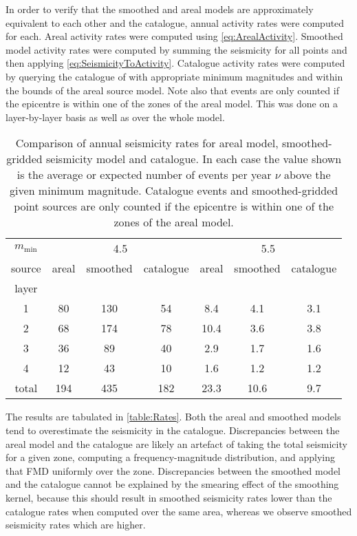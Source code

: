 \documentclass{article}
\begin{document}
In order to verify that the smoothed and areal models are approximately equivalent to each other and the catalogue, annual activity rates were computed for each.
Areal activity rates were computed using \eqref{eq:ArealActivity}.
Smoothed model activity rates were computed by summing the seismicity for all points and then applying \eqref{eq:SeismicityToActivity}.
Catalogue activity rates were computed by querying the catalogue of \cite{nath2010earthquake} with appropriate minimum magnitudes and within the bounds of the areal source model.
Note also that events are only counted if the epicentre is within one of the zones of the areal model.
This was done on a layer-by-layer basis as well as over the whole model.

\begin{table}
\caption[Comparison of annual seismicity rates]{Comparison of annual seismicity rates for areal model, smoothed-gridded seismicity model and catalogue.
In each case the value shown is the average or expected number of events per year $\nu$ above the given minimum magnitude.
Catalogue events and smoothed-gridded point sources are only counted if the epicentre is within one of the zones of the areal model.}
\label{table:Rates}
\centering
\begin{tabular}{ccccccc}
\toprule
$m_\text{min}$ & \multicolumn{3}{c}{4.5} & \multicolumn{3}{c}{5.5} \\
source &  areal & smoothed & catalogue & areal & smoothed & catalogue \\
\midrule
layer   &      &        &         &       &          &           \\
1       &   80 &    130 &      54 &   8.4 &      4.1 &       3.1 \\
2       &   68 &    174 &      78 &  10.4 &      3.6 &       3.8 \\
3       &   36 &     89 &      40 &   2.9 &      1.7 &       1.6 \\
4       &   12 &     43 &      10 &   1.6 &      1.2 &       1.2 \\
total   &  194 &    435 &     182 &  23.3 &     10.6 &       9.7 \\
\bottomrule
\end{tabular}
\end{table}

The results are tabulated in \autoref{table:Rates}.
Both the areal and smoothed models tend to overestimate the seismicity in the catalogue.
Discrepancies between the areal model and the catalogue are likely an artefact of taking the total seismicity for a given zone, computing a frequency-magnitude distribution, and applying that FMD uniformly over the zone.
Discrepancies between the smoothed model and the catalogue cannot be explained by the smearing effect of the smoothing kernel, because this should result in smoothed seismicity rates lower than the catalogue rates when computed over the same area, whereas we observe smoothed seismicity rates which are higher.
\end{document}

